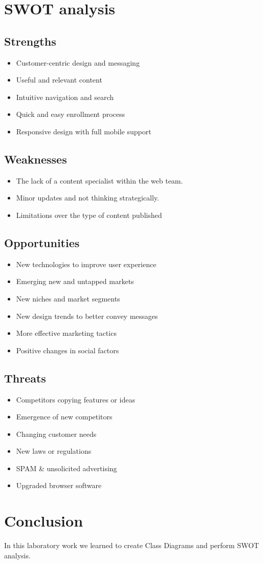 \documentclass[12pt,a4paper,titlepage]{article}
\begin{document}
\section{SWOT analysis}
\subsection{Strengths}
\begin{itemize}
	\item Customer-centric design and messaging
	\item Useful and relevant content
	\item Intuitive navigation and search
	\item Quick and easy enrollment process
	\item Responsive design with full mobile support
\end{itemize}

\subsection{Weaknesses}
\begin{itemize}
	\item The lack of a content specialist within the web team.
	\item Minor updates and not thinking strategically.
	\item Limitations over the type of content published
\end{itemize}
\subsection{Opportunities}
\begin{itemize}
	\item New technologies to improve user experience
	\item Emerging new and untapped markets
	\item New niches and market segments
	\item New design trends to better convey messages
	\item More effective marketing tactics
	\item Positive changes in social factors
\end{itemize}
\subsection{Threats}
\begin{itemize}
	\item Competitors copying features or ideas
	\item Emergence of new competitors
	\item Changing customer needs
	\item New laws or regulations
	\item SPAM \& unsolicited advertising
	\item Upgraded browser software
\end{itemize}

\section{Conclusion}
In this laboratory work we learned to create Class Diagrams and perform SWOT analysis.

\clearpage
\cleardoublepage
\end{document}
